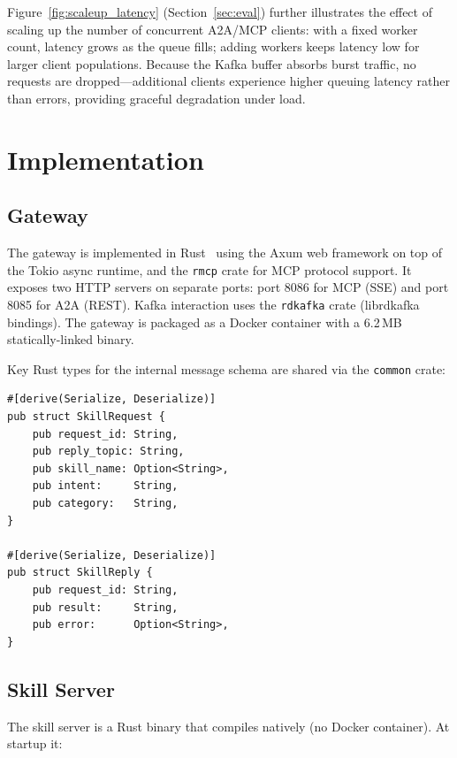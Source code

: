 \documentclass[sigconf,nonacm]{acmart}
\begin{document}
Figure~\ref{fig:scaleup_latency} (Section~\ref{sec:eval}) further illustrates the effect of scaling up the number of concurrent A2A/MCP clients: with a fixed worker count, latency grows as the queue fills; adding workers keeps latency low for larger client populations. Because the Kafka buffer absorbs burst traffic, no requests are dropped---additional clients experience higher queuing latency rather than errors, providing graceful degradation under load.

\section{Implementation}
\label{sec:impl}

\subsection{Gateway}

The gateway is implemented in Rust~\cite{rust2015} using the Axum web framework on top of the Tokio async runtime, and the \texttt{rmcp} crate for MCP protocol support. It exposes two HTTP servers on separate ports: port 8086 for MCP (SSE) and port 8085 for A2A (REST). Kafka interaction uses the \texttt{rdkafka} crate (librdkafka bindings). The gateway is packaged as a Docker container with a 6.2\,MB statically-linked binary.

Key Rust types for the internal message schema are shared via the \texttt{common} crate:

\begin{lstlisting}[style=rustcode, caption={Shared Kafka message types (common/src/lib.rs).}]
#[derive(Serialize, Deserialize)]
pub struct SkillRequest {
    pub request_id: String,
    pub reply_topic: String,
    pub skill_name: Option<String>,
    pub intent:     String,
    pub category:   String,
}

#[derive(Serialize, Deserialize)]
pub struct SkillReply {
    pub request_id: String,
    pub result:     String,
    pub error:      Option<String>,
}
\end{lstlisting}

\subsection{Skill Server}

The skill server is a Rust binary that compiles natively (no Docker container). At startup it:
\end{document}
